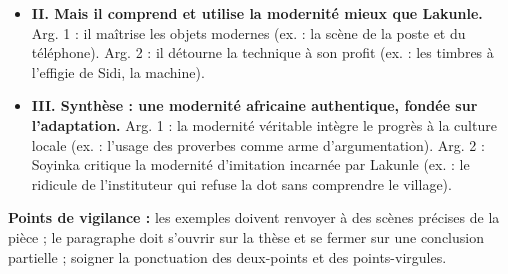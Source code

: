 \documentclass[11pt]{article}
\begin{document}
\begin{corrige}
\begin{enumerate}
\begin{itemize}
\item \textbf{II. Mais il comprend et utilise la modernité mieux que Lakunle.} Arg. 1 : il maîtrise les objets modernes (ex. : la scène de la poste et du téléphone). Arg. 2 : il détourne la technique à son profit (ex. : les timbres à l'effigie de Sidi, la machine).
\item \textbf{III. Synthèse : une modernité africaine authentique, fondée sur l'adaptation.} Arg. 1 : la modernité véritable intègre le progrès à la culture locale (ex. : l'usage des proverbes comme arme d'argumentation). Arg. 2 : Soyinka critique la modernité d'imitation incarnée par Lakunle (ex. : le ridicule de l'instituteur qui refuse la dot sans comprendre le village).
\end{itemize}
\end{enumerate}
\textbf{Points de vigilance :} les exemples doivent renvoyer à des scènes précises de la pièce ; le paragraphe doit s'ouvrir sur la thèse et se fermer sur une conclusion partielle ; soigner la ponctuation des deux-points et des points-virgules.
\end{corrige}
\end{document}

